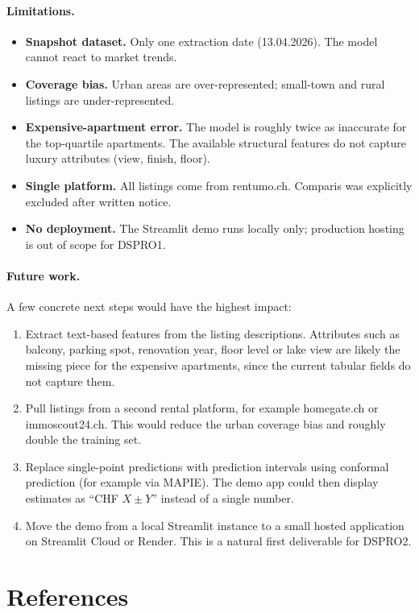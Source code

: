 \documentclass[11pt,a4paper]{article}
\begin{document}
\paragraph{Limitations.}
\begin{itemize}
    \item \textbf{Snapshot dataset.} Only one extraction date (13.04.2026). The model cannot react to market trends.
    \item \textbf{Coverage bias.} Urban areas are over-represented; small-town and rural listings are under-represented.
    \item \textbf{Expensive-apartment error.} The model is roughly twice as inaccurate for the top-quartile apartments. The available structural features do not capture luxury attributes (view, finish, floor).
    \item \textbf{Single platform.} All listings come from rentumo.ch. Comparis was explicitly excluded after written notice.
    \item \textbf{No deployment.} The Streamlit demo runs locally only; production hosting is out of scope for DSPRO1.
\end{itemize}

\paragraph{Future work.}
A few concrete next steps would have the highest impact:

\begin{enumerate}
    \item Extract text-based features from the listing descriptions. Attributes such as balcony, parking spot, renovation year, floor level or lake view are likely the missing piece for the expensive apartments, since the current tabular fields do not capture them.
    \item Pull listings from a second rental platform, for example homegate.ch or immoscout24.ch. This would reduce the urban coverage bias and roughly double the training set.
    \item Replace single-point predictions with prediction intervals using conformal prediction (for example via MAPIE). The demo app could then display estimates as ``CHF $X \pm Y$'' instead of a single number.
    \item Move the demo from a local Streamlit instance to a small hosted application on Streamlit Cloud or Render. This is a natural first deliverable for DSPRO2.
\end{enumerate}

\section{References}
\label{sec:references}



\end{document}
